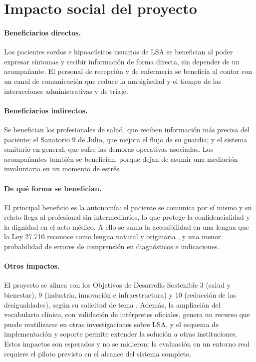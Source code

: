 \section{Impacto social del proyecto}

\paragraph{Beneficiarios directos.} Los pacientes sordos e hipoacúsicos usuarios de LSA se benefician al poder expresar síntomas y recibir información de forma directa, sin depender de un acompañante. El personal de recepción y de enfermería se beneficia al contar con un canal de comunicación que reduce la ambigüedad y el tiempo de las interacciones administrativas y de triaje.

\paragraph{Beneficiarios indirectos.} Se benefician los profesionales de salud, que reciben información más precisa del paciente; el Sanatorio 9 de Julio, que mejora el flujo de su guardia; y el sistema sanitario en general, que sufre las demoras operativas asociadas. Los acompañantes también se benefician, porque dejan de asumir una mediación involuntaria en un momento de estrés.

\paragraph{De qué forma se benefician.} El principal beneficio es la autonomía: el paciente se comunica por sí mismo y su relato llega al profesional sin intermediarios, lo que protege la confidencialidad y la dignidad en el acto médico. A ello se suma la accesibilidad en una lengua que la Ley 27.710 reconoce como lengua natural y originaria \parencite{ley27710}, y una menor probabilidad de errores de comprensión en diagnósticos e indicaciones.

\paragraph{Otros impactos.} El proyecto se alinea con los Objetivos de Desarrollo Sostenible 3 (salud y bienestar), 9 (industria, innovación e infraestructura) y 10 (reducción de las desigualdades), según su solicitud de tema \parencite{solicitudtema2026}. Además, la ampliación del vocabulario clínico, con validación de intérpretes oficiales, genera un recurso que puede reutilizarse en otras investigaciones sobre LSA, y el esquema de implementación y soporte permite extender la solución a otras instituciones. Estos impactos son esperados y no se midieron: la evaluación en un entorno real requiere el piloto previsto en el alcance del sistema completo.


